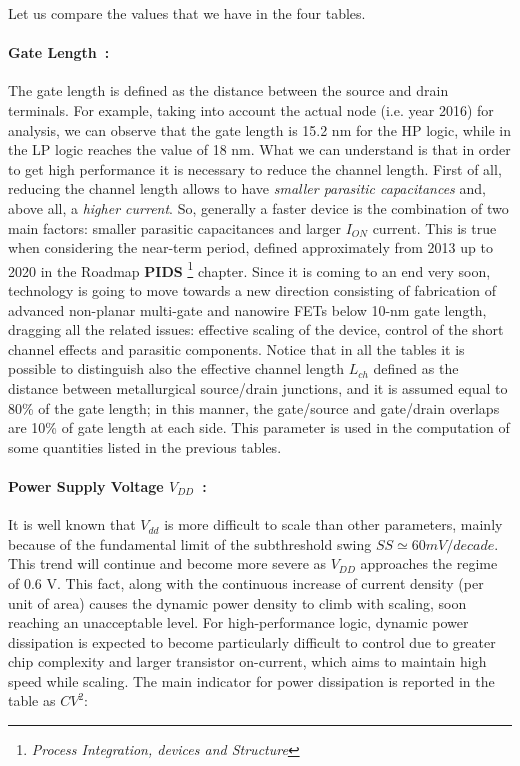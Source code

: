 \documentclass[a4paper, 12pt, twoside, openright]{report}
\begin{document}
\noindent Let us compare the values that we have in the four tables.

\paragraph{Gate Length~:}The gate length is defined as the distance between the source and drain terminals. For example, taking into account the actual node (i.e. year 2016) for analysis, we can observe that the gate length is 15.2 nm for the HP logic, while in the LP logic reaches the value of 18 nm. What we can understand is that in order to get high performance it is necessary to reduce the channel length. First of all, reducing the channel length allows to have \emph{smaller parasitic capacitances} and, above all, a \emph{higher current}. So, generally a faster device is the combination of two main factors: smaller parasitic capacitances and larger $I_{ON}$ current.
This is true when considering the near-term period, defined approximately from 2013 up to 2020 in the Roadmap \textbf{PIDS} \footnote{\emph{Process Integration, devices and Structure}} chapter. Since it is coming to an end very soon, technology is going to move towards a new direction consisting of fabrication of advanced non-planar multi-gate and nanowire FETs below 10-nm gate length, dragging all the related issues: effective scaling of the device, control of the short channel effects and parasitic components.
Notice that in all the tables it is possible to distinguish also the effective channel length $L_{ch}$ defined as the distance between metallurgical source/drain junctions, and it is assumed equal to 80\% of the gate length; in this manner, the gate/source and gate/drain overlaps are 10\% of gate length at each side. This parameter is used in the computation of some quantities listed in the previous tables.


\paragraph{Power Supply Voltage $V_{DD}$~:} It is well known that $V_{dd}$ is more difficult to scale than other parameters, mainly because of the fundamental limit of the subthreshold swing $SS\simeq60 mV/decade$. This trend will continue and become more severe as $V_{DD}$ approaches the regime of 0.6 V. This fact, along with the continuous increase of current density (per unit of area) causes the dynamic power density to climb with scaling, soon reaching an unacceptable level.
For high-performance logic, dynamic power dissipation is expected to become particularly difficult to control due to greater chip complexity and larger transistor on-current, which aims to maintain high speed while scaling. The main indicator for power dissipation is reported in the table as $CV^{2}$:
\end{document}
